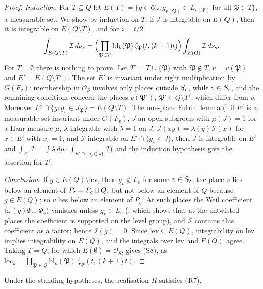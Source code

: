\begin{proof}
\emph{Induction.} For $T\subseteq Q$ let $E(T)=\{g\in\mathcal O_S:g_{v(\mathfrak P)}\in L_{v(\mathfrak P)}\text{ for all }\mathfrak P\in T\}$, a
measurable set. We show by induction on $T$: if $\mathcal I$ is integrable on $E(Q)$, then it is integrable on $E(Q\setminus T)$, and for $z=t/2$
\[
\int_{E(Q\setminus T)}\mathcal I\,d\nu_s=\Bigl(\prod_{\mathfrak P\in T}\mathrm{bl}_k(\mathfrak P)\,\zeta_{\mathfrak P}(t,(k+1)t)\Bigr)
\int_{E(Q)}\mathcal I\,d\nu_s .
\]
For $T=\emptyset$ there is nothing to prove. Let $T'=T\cup\{\mathfrak P\}$ with $\mathfrak P\notin T$, $v=v(\mathfrak P)$ and $E'=E(Q\setminus T')$.
The set $E'$ is invariant under right multiplication by $G(F_v)$: membership in $\mathcal O_S$ involves only places outside $S_\mathfrak c$, while
$v\in S_\mathfrak c$, and the remaining conditions concern the places $v(\mathfrak P')$, $\mathfrak P'\in Q\setminus T'$, which differ from $v$.
Moreover $E'\cap\{g:g_v\in J_{\mathfrak P}\}=E(Q\setminus T)$. The one-place Fubini lemma
(: if $E'$ is a measurable set invariant under $G(F_v)$, $J$ an open subgroup with
$\mu(J)=1$ for a Haar measure $\mu$, $\lambda$ integrable with $\lambda=1$ on $J$, $\mathcal I(xy)=\lambda(y)\,\mathcal I(x)$ for $x\in E'$ with
$x_v=1$, and $\mathcal I$ integrable on $E'\cap\{g_v\in J\}$, then $\mathcal I$ is integrable on $E'$ and $\int_{E'}\mathcal I=\int\lambda\,d\mu
\cdot\int_{E'\cap\{g_v\in J\}}\mathcal I$) and the induction hypothesis give the assertion for $T'$.

\emph{Conclusion.} If $g\in E(Q)\setminus\mathrm{lev}$, then $g_v\notin L_v$ for some $v\in S_\mathfrak c$; the place $v$ lies below an element of
$P_\mathfrak c=P_g\sqcup Q$, but not below an element of $Q$ because $g\in E(Q)$; so $v$ lies below an element of $P_g$. At such places the Weil
coefficient $\langle\omega(g)\Phi_\phi,\Phi_\phi\rangle$ vanishes unless $g_v\in L_v$
(, which shows that at the untwisted places the coefficient is
supported on the level group), and $\mathcal I$ contains this coefficient as a factor; hence $\mathcal I(g)=0$. Since $\mathrm{lev}\subseteq E(Q)$,
integrability on $\mathrm{lev}$ implies integrability on $E(Q)$, and the integrals over $\mathrm{lev}$ and $E(Q)$ agree. Taking $T=Q$, for which
$E(\emptyset)=\mathcal O_S$, gives (S8), as $\mathrm{loc}_k=\prod_{\mathfrak P\in Q}\mathrm{bl}_k(\mathfrak P)\,\zeta_{\mathfrak P}(t,(k+1)t)$.
\end{proof}

\begin{lemma}\label{pf:bundles:lem:R7}
Under the standing hypotheses, the realisation $R$ satisfies (R7).
\end{lemma}


